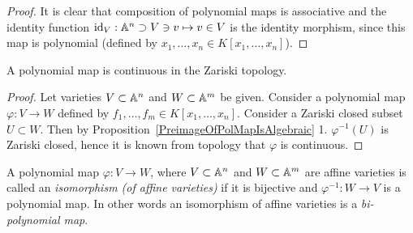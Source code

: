 \begin{proof}
    It is clear that composition of polynomial maps is associative and the identity function $\text{id}_V:\mathbb{A}^n \supset V\ni v\mapsto v\in V$ is the identity morphism, since this map is polynomial (defined by $x_1,\dots,x_n\in K[x_1,\dots,x_n]$).
\end{proof}
\begin{proposition}
    A polynomial map is continuous in the Zariski topology.
\end{proposition}
\begin{proof}
    Let varieties $V\subset \mathbb{A}^n$ and $W\subset \mathbb{A}^m$ be given. Consider a polynomial map $\varphi : V\rightarrow W$ defined by $f_1,\dots,f_m\in K[x_1,\dots,x_n]$. Consider a Zariski closed subset $U\subset W$. Then by Proposition~\ref{PreimageOfPolMapIsAlgebraic} 1. $\varphi^{-1}(U)$ is Zariski closed, hence it is known from topology that $\varphi$ is continuous. 
\end{proof}
\begin{definition}
    A polynomial map $\varphi: V\rightarrow W$, where $V\subset \mathbb{A}^n$ and $W\subset \mathbb{A}^m$ are affine varieties is called an \textit{isomorphism (of affine varieties)} if it is bijective and $\varphi^{-1} : W \rightarrow V$ is a polynomial map. In other words an isomorphism of affine varieties is a \textit{bi-polynomial map}.
\end{definition}


